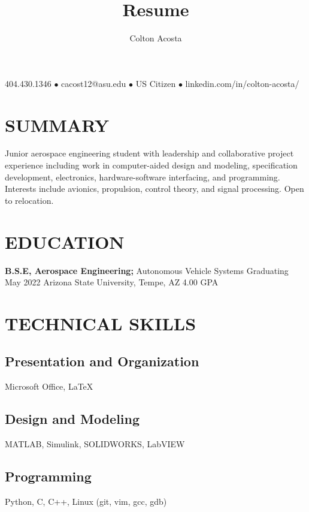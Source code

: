 \documentclass{article}
\makeatletter
\renewcommand{\maketitle}{
	\begin{center}
		{\huge\bfseries
			\theauthor}
			
		404.430.1346 $\bullet$ cacost12@asu.edu $\bullet$ US Citizen $\bullet$ linkedin.com/in/colton-acosta/
	\end{center}
}
\makeatother
\begin{document}
\title{Resume}
\author{Colton Acosta}
\maketitle
\section{SUMMARY}
Junior aerospace engineering student with leadership and collaborative project experience including work in computer-aided design and modeling, specification development, electronics, hardware-software interfacing, and programming. Interests include avionics, propulsion,  control theory, and signal processing. Open to relocation. 
\section{EDUCATION}
\textbf{B.S.E, Aerospace Engineering;} Autonomous Vehicle Systems
\hfill 
Graduating May 2022
\linebreak
Arizona State University, Tempe, AZ 
\hfill
4.00 GPA

\section{TECHNICAL SKILLS}
\subsection{Presentation and Organization}
Microsoft Office,  {\LaTeX}
\subsection{Design and Modeling}
MATLAB, Simulink, SOLIDWORKS, LabVIEW
\subsection{Programming} 
Python, C, C++, Linux (git, vim, gcc, gdb)
\end{document}
